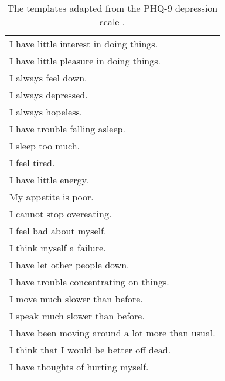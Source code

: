 \documentclass[letterpaper]{article} %
\begin{document}
\begin{table*}[htbp]
  \centering
  \begin{tabular}{|l|}
    \hline
    I have little interest in doing things. \\
    I have little pleasure in doing things. \\
    I always feel down. \\
    I always depressed. \\
    I always hopeless. \\
    I have trouble falling asleep. \\
    I sleep too much. \\
    I feel tired. \\
    I have little energy. \\
    My appetite is poor. \\
    I cannot stop overeating. \\
    I feel bad about myself. \\
    I think myself a failure. \\
    I have let other people down. \\
    I have trouble concentrating on things. \\
    I move much slower than before. \\
    I speak much slower than before. \\
    I have been moving around a lot more than usual. \\
    I think that I would be better off dead. \\
    I have thoughts of hurting myself. \\
    \hline
  \end{tabular}
  \caption{\label{tab:PHQ-9} The templates adapted from the PHQ-9 depression scale \citep{kroenke2001phq}. }
\end{table*}


\end{document}
